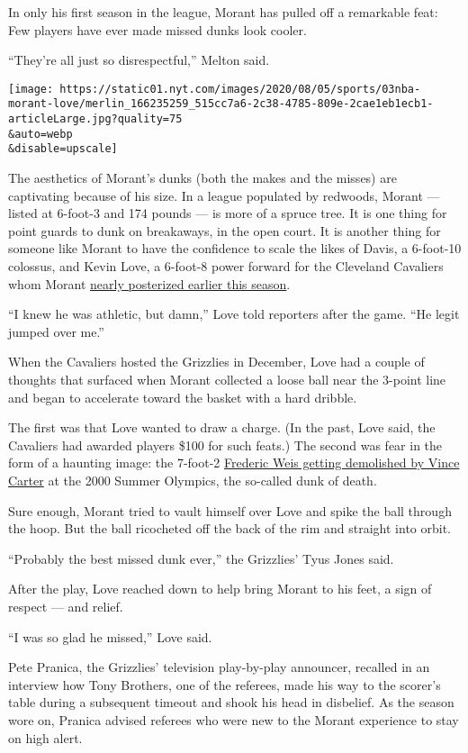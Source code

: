 In only his first season in the league, Morant has pulled off a
remarkable feat: Few players have ever made missed dunks look cooler.

``They're all just so disrespectful,'' Melton said.

\texttt{[image: https://static01.nyt.com/images/2020/08/05/sports/03nba-morant-love/merlin\_166235259\_515cc7a6-2c38-4785-809e-2cae1eb1ecb1-articleLarge.jpg?quality=75\\\&auto=webp\\\&disable=upscale]}

The aesthetics of Morant's dunks (both the makes and the misses) are
captivating because of his size. In a league populated by redwoods,
Morant --- listed at 6-foot-3 and 174 pounds --- is more of a spruce
tree. It is one thing for point guards to dunk on breakaways, in the
open court. It is another thing for someone like Morant to have the
confidence to scale the likes of Davis, a 6-foot-10 colossus, and Kevin
Love, a 6-foot-8 power forward for the Cleveland Cavaliers whom Morant
\href{https://www.youtube.com/watch?v=SJvHeuCLJAs}{nearly posterized
earlier this season}.

``I knew he was athletic, but damn,'' Love told reporters after the
game. ``He legit jumped over me.''

When the Cavaliers hosted the Grizzlies in December, Love had a couple
of thoughts that surfaced when Morant collected a loose ball near the
3-point line and began to accelerate toward the basket with a hard
dribble.

The first was that Love wanted to draw a charge. (In the past, Love
said, the Cavaliers had awarded players \$100 for such feats.) The
second was fear in the form of a haunting image: the 7-foot-2
\href{https://www.youtube.com/watch?v=k_uZeCymShQ}{Frederic Weis getting
demolished by Vince Carter} at the 2000 Summer Olympics, the so-called
dunk of death.

Sure enough, Morant tried to vault himself over Love and spike the ball
through the hoop. But the ball ricocheted off the back of the rim and
straight into orbit.

``Probably the best missed dunk ever,'' the Grizzlies' Tyus Jones said.

After the play, Love reached down to help bring Morant to his feet, a
sign of respect --- and relief.

``I was so glad he missed,'' Love said.

Pete Pranica, the Grizzlies' television play-by-play announcer, recalled
in an interview how Tony Brothers, one of the referees, made his way to
the scorer's table during a subsequent timeout and shook his head in
disbelief. As the season wore on, Pranica advised referees who were new
to the Morant experience to stay on high alert.

